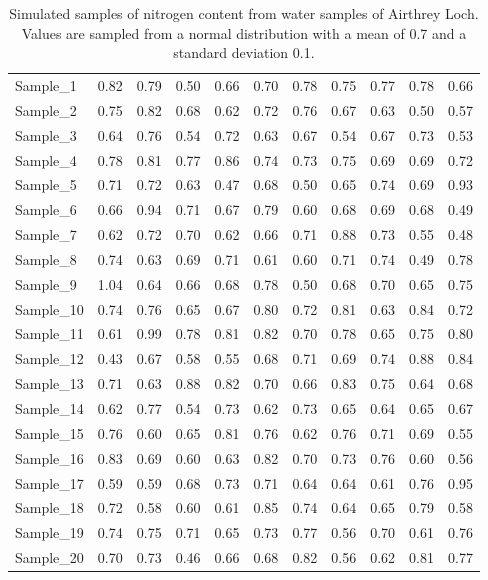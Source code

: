 \documentclass[
]{scrbook}
\begin{document}
\begin{longtable}[]{@{}lrrrrrrrrrr@{}}
\caption{\label{tab:unnamed-chunk-43}Simulated samples of nitrogen content from water samples of Airthrey Loch. Values are sampled from a normal distribution with a mean of 0.7 and a standard deviation 0.1.}\tabularnewline
\toprule
\endhead
Sample\_1 & 0.82 & 0.79 & 0.50 & 0.66 & 0.70 & 0.78 & 0.75 & 0.77 & 0.78 & 0.66 \\
Sample\_2 & 0.75 & 0.82 & 0.68 & 0.62 & 0.72 & 0.76 & 0.67 & 0.63 & 0.50 & 0.57 \\
Sample\_3 & 0.64 & 0.76 & 0.54 & 0.72 & 0.63 & 0.67 & 0.54 & 0.67 & 0.73 & 0.53 \\
Sample\_4 & 0.78 & 0.81 & 0.77 & 0.86 & 0.74 & 0.73 & 0.75 & 0.69 & 0.69 & 0.72 \\
Sample\_5 & 0.71 & 0.72 & 0.63 & 0.47 & 0.68 & 0.50 & 0.65 & 0.74 & 0.69 & 0.93 \\
Sample\_6 & 0.66 & 0.94 & 0.71 & 0.67 & 0.79 & 0.60 & 0.68 & 0.69 & 0.68 & 0.49 \\
Sample\_7 & 0.62 & 0.72 & 0.70 & 0.62 & 0.66 & 0.71 & 0.88 & 0.73 & 0.55 & 0.48 \\
Sample\_8 & 0.74 & 0.63 & 0.69 & 0.71 & 0.61 & 0.60 & 0.71 & 0.74 & 0.49 & 0.78 \\
Sample\_9 & 1.04 & 0.64 & 0.66 & 0.68 & 0.78 & 0.50 & 0.68 & 0.70 & 0.65 & 0.75 \\
Sample\_10 & 0.74 & 0.76 & 0.65 & 0.67 & 0.80 & 0.72 & 0.81 & 0.63 & 0.84 & 0.72 \\
Sample\_11 & 0.61 & 0.99 & 0.78 & 0.81 & 0.82 & 0.70 & 0.78 & 0.65 & 0.75 & 0.80 \\
Sample\_12 & 0.43 & 0.67 & 0.58 & 0.55 & 0.68 & 0.71 & 0.69 & 0.74 & 0.88 & 0.84 \\
Sample\_13 & 0.71 & 0.63 & 0.88 & 0.82 & 0.70 & 0.66 & 0.83 & 0.75 & 0.64 & 0.68 \\
Sample\_14 & 0.62 & 0.77 & 0.54 & 0.73 & 0.62 & 0.73 & 0.65 & 0.64 & 0.65 & 0.67 \\
Sample\_15 & 0.76 & 0.60 & 0.65 & 0.81 & 0.76 & 0.62 & 0.76 & 0.71 & 0.69 & 0.55 \\
Sample\_16 & 0.83 & 0.69 & 0.60 & 0.63 & 0.82 & 0.70 & 0.73 & 0.76 & 0.60 & 0.56 \\
Sample\_17 & 0.59 & 0.59 & 0.68 & 0.73 & 0.71 & 0.64 & 0.64 & 0.61 & 0.76 & 0.95 \\
Sample\_18 & 0.72 & 0.58 & 0.60 & 0.61 & 0.85 & 0.74 & 0.64 & 0.65 & 0.79 & 0.58 \\
Sample\_19 & 0.74 & 0.75 & 0.71 & 0.65 & 0.73 & 0.77 & 0.56 & 0.70 & 0.61 & 0.76 \\
Sample\_20 & 0.70 & 0.73 & 0.46 & 0.66 & 0.68 & 0.82 & 0.56 & 0.62 & 0.81 & 0.77 \\
\bottomrule
\end{longtable}
\end{document}
